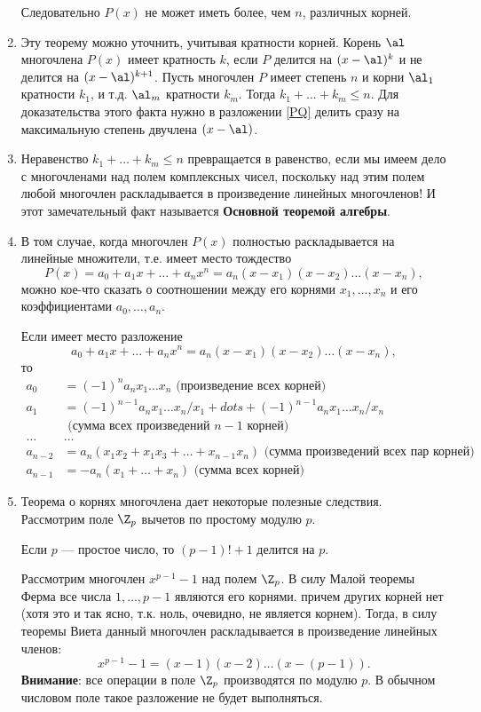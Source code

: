 \begin{enumerate}
Следовательно $P(x)$ не может иметь более, чем $n$, различных корней.
\epf

\item Эту теорему можно уточнить, учитывая кратности корней. Корень $\al$ многочлена $P(x)$ имеет кратность $k$, если $P$ делится на $(x-\al)^k$ и не делится на $(x-\al)^{k+1}$. Пусть многочлен $P$ имеет степень $n$ и корни $\al_1$ кратности $k_1$, и т.д. $\al_m$ кратности $k_m$. Тогда $k_1+\dots+k_m\le n$. Для доказательства этого факта нужно в разложении \eqref{PQ} делить сразу на максимальную степень двучлена $(x-\al)$.
\item Неравенство $k_1+\dots+k_m\le n$ превращается в равенство, если мы имеем дело с многочленами над полем комплексных чисел, поскольку над этим полем любой многочлен раскладывается в произведение линейных многочленов! И этот замечательный факт называется \textbf{Основной теоремой алгебры}.




\item В том случае, когда многочлен $P(x)$ полностью раскладывается на линейные множители, т.е. имеет место тождество
$$
P(x)=a_0+a_1x+\dots+a_nx^n = a_n(x-x_1)(x-x_2)\dots(x-x_n),
$$
можно кое-что сказать о соотношении между его корнями $x_1,\dots,x_n$ и его коэффициентами $a_0,\dots,a_n$.
\begin{thrm}[Виета]
Если имеет место разложение
$$
a_0+a_1x+\dots+a_nx^n = a_n(x-x_1)(x-x_2)\dots(x-x_n),
$$
то
\begin{align*}
a_0 & = (-1)^na_nx_1\dots x_n\mbox{  (произведение всех корней)} \\
a_1 & = (-1)^{n-1}a_nx_1\dots x_n/x_1+dots+(-1)^{n-1}a_nx_1\dots x_n/x_n \\
    & \mbox{  (сумма всех произведений $n-1$ корней)} \\
\dots & \dots \\
a_{n-2} & = a_n(x_1x_2+x_1x_3+\dots + x_{n-1}x_n)\mbox{  (сумма произведений всех пар корней)} \\
a_{n-1} & = -a_n(x_1+\dots+x_n) \mbox{  (сумма всех корней)}
\end{align*}
\end{thrm}

\item Теорема о корнях многочлена дает некоторые полезные следствия. Рассмотрим поле $\Z_p$ вычетов по простому модулю $p$.
\begin{thrm}[Вильсона]\label{Wilson}
Если $p$ --- простое число, то $(p-1)!+1$ делится на $p$.
\end{thrm}
\pf
Рассмотрим многочлен $x^{p-1}-1$ над полем $\Z_p$. В силу Малой теоремы Ферма все числа $1,\dots,p-1$ являются его корнями. причем других корней нет (хотя это и так ясно, т.к. ноль, очевидно, не является корнем). Тогда, в силу теоремы Виета данный многочлен раскладывается в произведение линейных членов:
$$
x^{p-1}-1 = (x-1)(x-2)\dots (x-(p-1)).
$$
\textbf{Внимание}: все операции в поле $\Z_p$ производятся по модулю $p$. В обычном числовом поле такое разложение не будет выполняться.


\end{enumerate}
